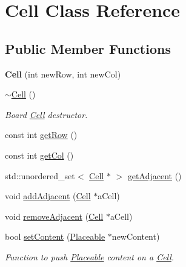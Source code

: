 \hypertarget{class_cell}{}\section{Cell Class Reference}
\label{class_cell}
\subsection*{Public Member Functions}
\begin{DoxyCompactItemize}
\item 
\hypertarget{class_cell_a99702fd5fc54b66ffae38a7098c844fd}{}\label{class_cell_a99702fd5fc54b66ffae38a7098c844fd} 
{\bfseries Cell} (int new\+Row, int new\+Col)
\item 
\hypertarget{class_cell_a9fa559f7a28e2b4336c6879ca09304d8}{}\label{class_cell_a9fa559f7a28e2b4336c6879ca09304d8} 
\hyperlink{class_cell_a9fa559f7a28e2b4336c6879ca09304d8}{$\sim$\+Cell} ()
\begin{DoxyCompactList}\small\item\em Board \hyperlink{class_cell}{Cell} destructor. \end{DoxyCompactList}\item 
const int \hyperlink{class_cell_a7d9b27ccd514968a69a2b9ee0ad6c612}{get\+Row} ()
\item 
const int \hyperlink{class_cell_a4c9b2812a2d37e17c1a473e8b905d048}{get\+Col} ()
\item 
std\+::unordered\+\_\+set$<$ \hyperlink{class_cell}{Cell} $\ast$ $>$ \hyperlink{class_cell_a9912ab381441093706286584eff721fa}{get\+Adjacent} ()
\item 
void \hyperlink{class_cell_a90d2e75867bd5f2b553dec1498fdf4e6}{add\+Adjacent} (\hyperlink{class_cell}{Cell} $\ast$a\+Cell)
\item 
void \hyperlink{class_cell_a5d9bda81ac204c982b084c7b02f4d6de}{remove\+Adjacent} (\hyperlink{class_cell}{Cell} $\ast$a\+Cell)
\item 
\hypertarget{class_cell_add026562137122494104071baa175473}{}\label{class_cell_add026562137122494104071baa175473} 
bool \hyperlink{class_cell_add026562137122494104071baa175473}{set\+Content} (\hyperlink{class_placeable}{Placeable} $\ast$new\+Content)
\begin{DoxyCompactList}\small\item\em Function to push \hyperlink{class_placeable}{Placeable} content on a \hyperlink{class_cell}{Cell}. \end{DoxyCompactList}\item 
\hypertarget{class_cell_af1ac11342618275ec6684261e661cb52}{}\label{class_cell_af1ac11342618275ec6684261e661cb52} 

\end{DoxyCompactItemize}
